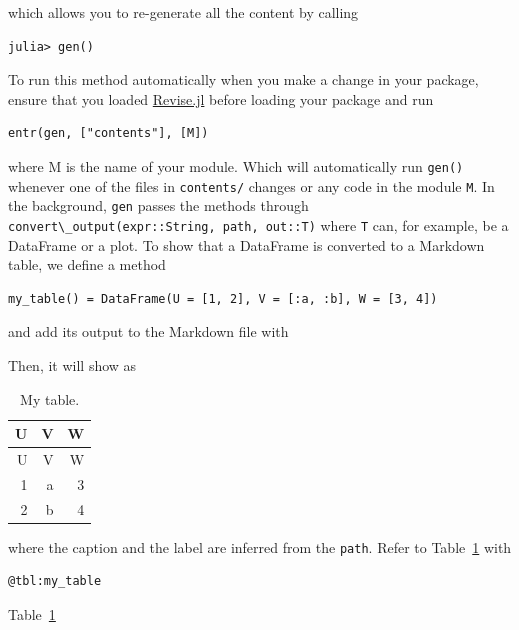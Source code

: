 \documentclass[
  14pt
  american,
  paper=a4,
  ,captions=tableheading
]{scrreprt}
\newcommand{\passthrough}[1]{#1}
\renewenvironment{quote}{\begin{customblockquote}\list{}{\rightmargin=0em\leftmargin=0em}%
\item\relax\color{blockquote-text}\ignorespaces}{\unskip\unskip\endlist\end{customblockquote}}
\begin{document}
which allows you to re-generate all the content by calling

\begin{lstlisting}
julia> gen()
\end{lstlisting}

To run this method automatically when you make a change in your package,
ensure that you loaded
\href{https://github.com/timholy/Revise.jl}{Revise.jl} before loading
your package and run

\begin{lstlisting}
entr(gen, ["contents"], [M])
\end{lstlisting}

where M is the name of your module. Which will automatically run
\passthrough{\lstinline!gen()!} whenever one of the files in
\passthrough{\lstinline!contents/!} changes or any code in the module
\passthrough{\lstinline!M!}. In the background,
\passthrough{\lstinline!gen!} passes the methods through
\passthrough{\lstinline!convert\_output(expr::String, path, out::T)!}
where \passthrough{\lstinline!T!} can, for example, be a DataFrame or a
plot. To show that a DataFrame is converted to a Markdown table, we
define a method

\begin{lstlisting}
my_table() = DataFrame(U = [1, 2], V = [:a, :b], W = [3, 4])
\end{lstlisting}

and add its output to the Markdown file with

Then, it will show as

\hypertarget{tbl:my_table}{}
\begin{longtable}[]{@{}rrr@{}}
\caption{\label{tbl:my_table}My table.}\tabularnewline
\toprule
U & V & W \\
\midrule
\endfirsthead
\toprule
U & V & W \\
\midrule
\endhead
1 & a & 3 \\
2 & b & 4 \\
\bottomrule
\end{longtable}

where the caption and the label are inferred from the
\passthrough{\lstinline!path!}. Refer to Table~\ref{tbl:my_table} with

\begin{lstlisting}
@tbl:my_table
\end{lstlisting}

\begin{quote}
Table~\ref{tbl:my_table}
\end{quote}
\end{document}
